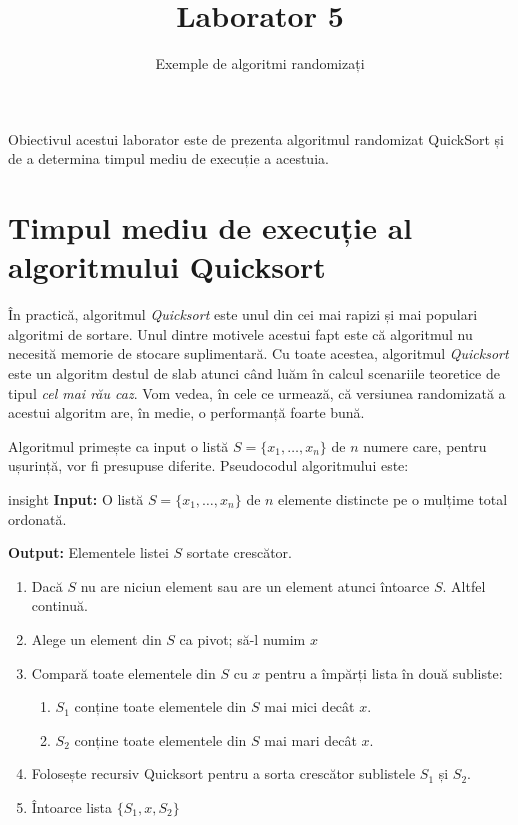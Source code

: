 \documentclass[]{article}
\title{Laborator 5}
\subtitle{Exemple de algoritmi randomizați}
\author{}
\date{}
\providecommand{\tightlist}{%
  \setlength{\itemsep}{0pt}\setlength{\parskip}{0pt}}
\newenvironment{frshaded_insight*}{%
  \def\FrameCommand{\fboxrule=\FrameRule\fboxsep=\FrameSep \fcolorbox{framecolor_insight}{shadecolor_insight}}%
  \MakeFramed {\advance\hsize-\width \FrameRestore}}%
{\endMakeFramed}
\newenvironment{rmdblock_insight}[1]
  {\begin{frshaded_insight*}
  \begin{itemize}
  \renewcommand{\labelitemi}{
    \raisebox{-.7\height}[0pt][0pt]{
      {\setkeys{Gin}{width=2em,keepaspectratio}\texttt{[image: images/icons/\#1]}}
    }
  }
  \item
  }
  {
  \end{itemize}
  \end{frshaded_insight*}
  }
\newenvironment{rmdinsight}
  {\begin{rmdblock_insight}{insight}}
  {\end{rmdblock_insight}}
\begin{document}
\maketitle

\thispagestyle{fancy}

Obiectivul acestui laborator este de prezenta algoritmul randomizat
QuickSort și de a determina timpul mediu de execuție a acestuia.

\section{Timpul mediu de execuție al algoritmului
Quicksort}\label{timpul-mediu-de-executie-al-algoritmului-quicksort}

În practică, algoritmul \emph{Quicksort} este unul din cei mai rapizi și
mai populari algoritmi de sortare. Unul dintre motivele acestui fapt
este că algoritmul nu necesită memorie de stocare suplimentară. Cu toate
acestea, algoritmul \emph{Quicksort} este un algoritm destul de slab
atunci când luăm în calcul scenariile teoretice de tipul \emph{cel mai
rău caz}. Vom vedea, în cele ce urmează, că versiunea randomizată a
acestui algoritm are, în medie, o performanță foarte bună.

Algoritmul primește ca input o listă \(S = \{x_1,\ldots, x_n\}\) de
\(n\) numere care, pentru ușurință, vor fi presupuse diferite.
Pseudocodul algoritmului este:

\begin{rmdinsight}
\textbf{Input:} O listă \(S = \{x_1,\ldots, x_n\}\) de \(n\) elemente
distincte pe o mulțime total ordonată.

\textbf{Output:} Elementele listei \(S\) sortate crescător.

\begin{enumerate}
\def\labelenumi{\arabic{enumi}.}
\tightlist
\item
  Dacă \(S\) nu are niciun element sau are un element atunci întoarce
  \(S\). Altfel continuă.
\item
  Alege un element din \(S\) ca pivot; să-l numim \(x\)
\item
  Compară toate elementele din \(S\) cu \(x\) pentru a împărți lista în
  două subliste:

  \begin{enumerate}
  \def\labelenumii{\alph{enumii})}
  \tightlist
  \item
    \(S_1\) conține toate elementele din \(S\) mai mici decât \(x\).
  \item
    \(S_2\) conține toate elementele din \(S\) mai mari decât \(x\).
  \end{enumerate}
\item
  Folosește recursiv Quicksort pentru a sorta crescător sublistele
  \(S_1\) și \(S_2\).
\item
  Întoarce lista \(\{S_1, x, S_2\}\)
\end{enumerate}
\end{rmdinsight}
\end{document}
